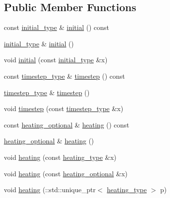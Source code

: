 \subsection*{Public Member Functions}
\begin{DoxyCompactItemize}
\item 
const \hyperlink{classthermo__t_a3b889c80ce97870a6967ebee963438ed}{initial\+\_\+type} \& \hyperlink{classthermo__t_a279984e2d428ca1cdc75b599647a1a13}{initial} () const 
\item 
\hyperlink{classthermo__t_a3b889c80ce97870a6967ebee963438ed}{initial\+\_\+type} \& \hyperlink{classthermo__t_a07569ef2c98506acafb4d45cf2ba3007}{initial} ()
\item 
void \hyperlink{classthermo__t_a4e612c1cc79e5b7910e5a8aab33769e8}{initial} (const \hyperlink{classthermo__t_a3b889c80ce97870a6967ebee963438ed}{initial\+\_\+type} \&x)
\item 
const \hyperlink{classthermo__t_a6895e9b201424e2fada14df933774b0c}{timestep\+\_\+type} \& \hyperlink{classthermo__t_a4eb690c69691f503eb8798729950a0bc}{timestep} () const 
\item 
\hyperlink{classthermo__t_a6895e9b201424e2fada14df933774b0c}{timestep\+\_\+type} \& \hyperlink{classthermo__t_aa0b0b27613dc49acab5e36bf23d75a62}{timestep} ()
\item 
void \hyperlink{classthermo__t_afcb6e9f9b2940fb8ac8bcd8d9e155101}{timestep} (const \hyperlink{classthermo__t_a6895e9b201424e2fada14df933774b0c}{timestep\+\_\+type} \&x)
\item 
const \hyperlink{classthermo__t_a07769e3087269c95ee4fc162c6bf4341}{heating\+\_\+optional} \& \hyperlink{classthermo__t_a969cfd3ae1e0384ef167460d6e7f49a4}{heating} () const 
\item 
\hyperlink{classthermo__t_a07769e3087269c95ee4fc162c6bf4341}{heating\+\_\+optional} \& \hyperlink{classthermo__t_a7d238a6312e96860cb90a4a4a9fc8c81}{heating} ()
\item 
void \hyperlink{classthermo__t_a6304d053b24451d70535b6c4a9e216b7}{heating} (const \hyperlink{classthermo__t_a53d64092b110ebaf8c36a23a2c9c40ec}{heating\+\_\+type} \&x)
\item 
void \hyperlink{classthermo__t_a1cf016365963f545536e19be13712bb3}{heating} (const \hyperlink{classthermo__t_a07769e3087269c95ee4fc162c6bf4341}{heating\+\_\+optional} \&x)
\item 
void \hyperlink{classthermo__t_ae78c9120bb615a064bc6b7d35ec0e852}{heating} (\+::std\+::unique\+\_\+ptr$<$ \hyperlink{classthermo__t_a53d64092b110ebaf8c36a23a2c9c40ec}{heating\+\_\+type} $>$ p)

\end{DoxyCompactItemize}
